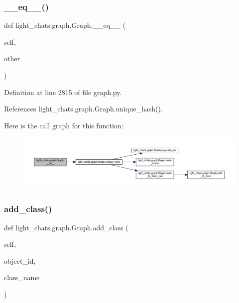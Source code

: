\subsubsection{\texorpdfstring{\+\_\+\+\_\+eq\+\_\+\+\_\+()}{\_\_eq\_\_()}}
{\footnotesize\ttfamily def light\+\_\+chats.\+graph.\+Graph.\+\_\+\+\_\+eq\+\_\+\+\_\+ (\begin{DoxyParamCaption}\item[{}]{self,  }\item[{}]{other }\end{DoxyParamCaption})}



Definition at line 2815 of file graph.\+py.



References light\+\_\+chats.\+graph.\+Graph.\+unique\+\_\+hash().

Here is the call graph for this function\+:
\nopagebreak
\begin{figure}[H]
\begin{center}
\leavevmode
\includegraphics[width=350pt]{classlight__chats_1_1graph_1_1Graph_a56d79ef43ac8f25d399228cc57f5fa25_cgraph}
\end{center}
\end{figure}
\mbox{\label{classlight__chats_1_1graph_1_1Graph_acb4a884cb1259a506399e8d1eb7a2f33}} 
\subsubsection{\texorpdfstring{add\+\_\+class()}{add\_class()}}
{\footnotesize\ttfamily def light\+\_\+chats.\+graph.\+Graph.\+add\+\_\+class (\begin{DoxyParamCaption}\item[{}]{self,  }\item[{}]{object\+\_\+id,  }\item[{}]{class\+\_\+name }\end{DoxyParamCaption})}



